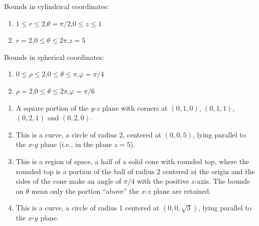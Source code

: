 {Bounds in cylindrical coordinates:
\begin{enumerate}
	\item $1\leq r\leq 2$,\quad $\theta= \pi/2$,\quad $0\leq z\leq 1$

	\item $r= 2$,\quad $0\leq \theta\leq 2\pi$,\quad $z=5$
\end{enumerate}

Bounds in spherical coordinates:

\begin{enumerate}\addtocounter{enumii}{2}
	\item $0\leq\rho\leq2$,\quad $0\leq \theta\leq\pi$,\quad $\varphi = \pi/4$
	
	\item $\rho=2$,\quad $0\leq \theta\leq2\pi$,\quad $\varphi = \pi/6$

\end{enumerate}
}
{\begin{enumerate}
\item	A square portion of the $y$-$z$ plane with corners at $(0,1,0)$, $(0,1,1)$, $(0,2,1)$ and $(0,2,0)$.

\item	 This is a curve, a circle of radius 2, centered at $(0,0,5)$, lying parallel to the $x$-$y$ plane (i.e., in the plane $z=5$).

\item	This is a region of space, a half of a solid cone with rounded top, where the rounded top is a portion of the ball of radius 2 centered at the origin and the sides of the cone make an angle of $\pi/4$ with the positive $z$-axis. The bounds on $\theta$ mean only the portion ``above'' the $x$-$z$ plane are retained.

\item	This is a curve, a circle of radius 1 centered at $(0,0,\sqrt 3)$, lying parallel to the $x$-$y$ plane.

\end{enumerate}
}
